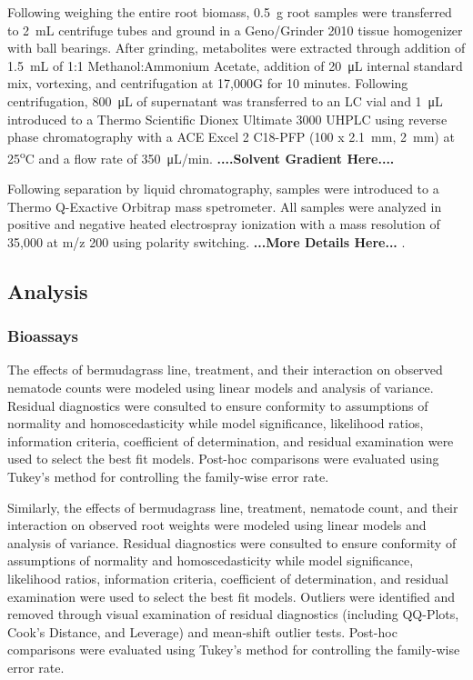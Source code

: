 \documentclass[9pt,lineno]{elife}
\begin{document}
Following weighing the entire root biomass, \SI{0.5}{\gram} root samples were transferred to \SI{2}{\milli\liter} centrifuge tubes and ground in a Geno/Grinder 2010 tissue homogenizer with ball bearings.  After grinding, metabolites were extracted through addition of \SI{1.5}{\milli\liter} of 1:1 Methanol:Ammonium Acetate, addition of \SI{20}{\micro\liter} internal standard mix, vortexing, and centrifugation at 17,000G for 10 minutes.  Following centrifugation, \SI{800}{\micro\liter} of supernatant was transferred to an LC vial and \SI{1}{\micro\liter} introduced to a Thermo Scientific Dionex Ultimate 3000 UHPLC using reverse phase chromatography with a ACE Excel 2 C18-PFP (100 x \SI{2.1}{\milli\meter}, \SI{2}{\milli\meter}) at 25\textsuperscript{o}C and a flow rate of \SI{350}{\micro\liter}/min.  \textbf{....Solvent Gradient Here....} 

Following separation by liquid chromatography, samples were introduced to a Thermo Q-Exactive Orbitrap mass spetrometer.  All samples were analyzed in positive and negative heated electrospray ionization with a mass resolution of 35,000 at m/z 200 using polarity switching. \textbf{...More Details Here...} .  


\subsection{Analysis}

\subsubsection{Bioassays}

The effects of bermudagrass line, treatment, and their interaction on observed nematode counts were modeled using linear models and analysis of variance.  Residual diagnostics were consulted to ensure conformity to assumptions of normality and homoscedasticity while model significance, likelihood ratios, information criteria, coefficient of determination, and residual examination were used to select the best fit models.  Post-hoc comparisons were evaluated using Tukey's method for controlling the family-wise error rate. 

Similarly, the effects of bermudagrass line, treatment, nematode count, and their interaction on observed root weights were modeled using linear models and analysis of variance. Residual diagnostics were consulted to ensure conformity of assumptions of normality and homoscedasticity while model significance, likelihood ratios, information criteria, coefficient of determination, and residual examination were used to select the best fit models.  Outliers were identified and removed through visual examination of residual diagnostics (including QQ-Plots, Cook's Distance, and Leverage) and mean-shift outlier tests.  Post-hoc comparisons were evaluated using Tukey's method for controlling the family-wise error rate.
\end{document}
